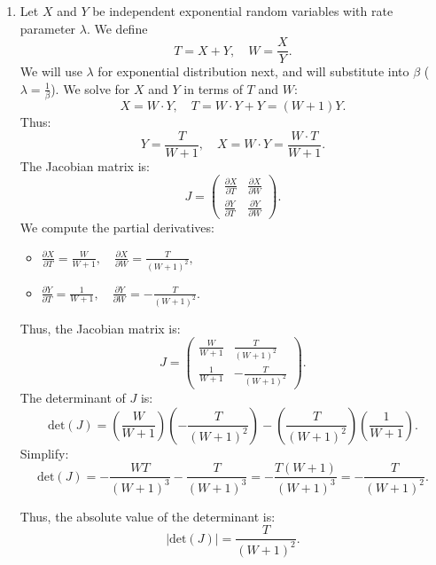 \documentclass[12pt,letterpaper, onecolumn]{exam}
\begin{document}
\begin{questions}
\begin{solution}
    \begin{enumerate}
        \item Let $X$ and $Y$ be independent exponential random variables with rate parameter $\lambda$. We define \[ T = X + Y, \quad W = \frac{X}{Y}.\] We will use $\lambda$ for exponential distribution next, and will substitute into $\beta$ ($\lambda = \frac{1}{\beta}$).
        We solve for $X$ and $Y$ in terms of $T$ and $W$: \[X = W \cdot Y, \quad T = W \cdot Y + Y = (W + 1) Y.\]
        Thus: \[ Y = \frac{T}{W + 1}, \quad X = W \cdot Y = \frac{W \cdot T}{W + 1}. \]
        The Jacobian matrix is: \[ J = 
        \begin{pmatrix} 
            \frac{\partial X}{\partial T} & \frac{\partial X}{\partial W} \\
            \frac{\partial Y}{\partial T} & \frac{\partial Y}{\partial W} 
        \end{pmatrix}.
        \]
        We compute the partial derivatives:
        \begin{itemize}
            \item $\frac{\partial X}{\partial T} = \frac{W}{W + 1}, \quad \frac{\partial X}{\partial W} = \frac{T}{(W + 1)^2},$
            \item $\frac{\partial Y}{\partial T} = \frac{1}{W + 1}, \quad \frac{\partial Y}{\partial W} = -\frac{T}{(W + 1)^2}.$
        \end{itemize}
        Thus, the Jacobian matrix is:
        \[
        J = \begin{pmatrix} 
        \frac{W}{W + 1} & \frac{T}{(W + 1)^2} \\
        \frac{1}{W + 1} & -\frac{T}{(W + 1)^2}
        \end{pmatrix}.
        \]
        The determinant of $J$ is:
        \[
        \text{det}(J) = \left( \frac{W}{W + 1} \right) \left( -\frac{T}{(W + 1)^2} \right) - \left( \frac{T}{(W + 1)^2} \right) \left( \frac{1}{W + 1} \right).
        \]
        Simplify:
        \[
        \text{det}(J) = -\frac{W T}{(W + 1)^3} - \frac{T}{(W + 1)^3} = -\frac{T(W + 1)}{(W + 1)^3} = -\frac{T}{(W + 1)^2}.
        \]

        Thus, the absolute value of the determinant is:
        \[
        |\text{det}(J)| = \frac{T}{(W + 1)^2}.
        \]


\end{enumerate}
\end{solution}
\end{questions}
\end{document}
